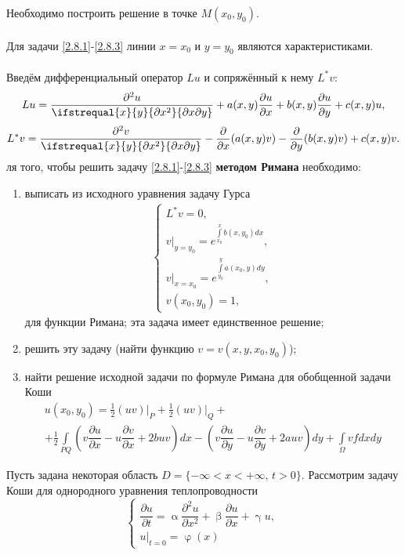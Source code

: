 \documentclass[a4paper, 12pt]{report}
\numberwithin{equation}{section}
\renewcommand{\alpha}{\upalpha}
\renewcommand{\beta}{\upbeta}
\renewcommand{\gamma}{\upgamma}
\renewcommand{\varphi}{\upvarphi}
\newcommand{\pderiv}[2]{\dfrac{\partial #1}{\partial #2}}
\newcommand{\pderivtwo}[3]{\dfrac{\partial^2 #1}{\ifstrequal{#2}{#3}{\partial #2^2}{\partial #2 \partial #3}}}
\begin{document}
	Необходимо построить решение в точке $M(x_0,y_0)$.\\\\
	Для задачи \eqref{2.8.1}-\eqref{2.8.3} линии $x=x_0$ и $y=y_0$ являются характеристиками.\\\\
	Введём дифференциальный оператор $Lu$ и сопряжённый к нему $L^*v$:
	$$ Lu = \pderivtwo{u}{x}{y} + a(x,y)\pderiv{u}{x} +b(x,y)\pderiv{u}{y} + c(x,y)u, $$
	$$ L^*v = \pderivtwo{v}{x}{y} -\pderiv{ }{x}(a(x,y)v) -\pderiv{ }{y}(b(x,y)v) + c(x,y)v. $$
	ля того, чтобы решить задачу \eqref{2.8.1}-\eqref{2.8.3} \textbf{методом Римана} необходимо:
	\begin{enumerate}
		\item выписать из исходного уравнения задачу Гурса \begin{equation}
			\begin{gathered}
				\label{2.8.6}
				\begin{cases}
					L^*v=0,\\
					v|_{y=y_0} = e^{\int\limits_{x_0}^x b(x,y_0)dx},\\
					v|_{x=x_0} = e^{\int\limits_{y_0}^y a(x_0,y)dy},\\
					v(x_0,y_0)=1,
				\end{cases}
			\end{gathered}
		\end{equation} для функции Римана; эта задача имеет единственное решение;
		\item решить эту задачу (найти функцию $v=v(x,y, x_0, y_0)$);
		\item найти решение исходной задачи по формуле Римана для обобщенной задачи Коши
		\begin{equation}
			\begin{gathered}
				\label{2.8.7}
				u(x_0,y_0) = \frac{1}{2}(uv)\Bigr|_P + \frac{1}{2}(uv)\Bigr|_Q+\\+
				\frac{1}{2}\int\limits_{PQ}\left(v\pderiv{u}{x} - u\pderiv{v}{x} + 2buv\right)dx -
				\left(v\pderiv{u}{y} - u\pderiv{v}{y} + 2auv\right)dy +
				\int\limits_\Omega vfdxdy
			\end{gathered}
		\end{equation}
	\end{enumerate}
	Пусть задана некоторая область $D=\{-\infty<x<+\infty\text{, } t>0\}$. Рассмотрим задачу Коши для однородного уравнения теплопроводности
	\begin{equation}\label{2.14.1}
		\begin{cases}
			\pderiv{u}{t}=\alpha\pderiv{^2u}{x^2}+\beta\pderiv{u}{x}+\gamma u\text{, } \\
			u|_{t=0}=\varphi(x)
		\end{cases}
	\end{equation}
\end{document}

